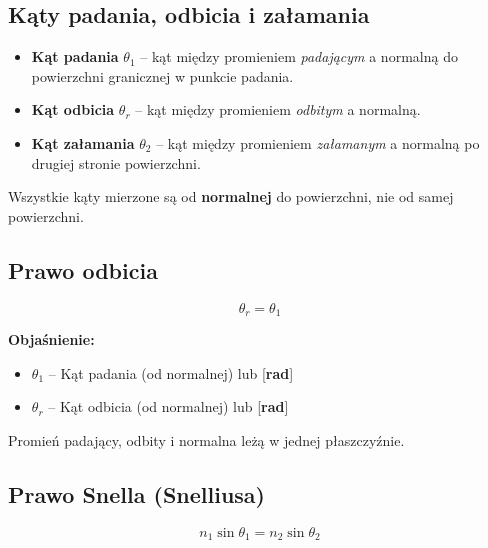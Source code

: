 \documentclass[12pt,a4paper]{article}
\newcommand{\oznaczenie}[2]{%
  \item $#1$ -- #2%
}
\begin{document}
\subsection{Kąty padania, odbicia i załamania}

\begin{itemize}
  \item \textbf{Kąt padania} $\theta_1$ -- kąt między promieniem \emph{padającym}
        a normalną do powierzchni granicznej w punkcie padania.
  \item \textbf{Kąt odbicia} $\theta_r$ -- kąt między promieniem \emph{odbitym}
        a normalną.
  \item \textbf{Kąt załamania} $\theta_2$ -- kąt między promieniem \emph{załamanym}
        a normalną po drugiej stronie powierzchni.
\end{itemize}

Wszystkie kąty mierzone są od \textbf{normalnej} do powierzchni, nie od samej powierzchni.

\subsection{Prawo odbicia}

\begin{wzorbox}
\begin{equation}
  \theta_r = \theta_1
  \label{eq:prawo_odbicia}
\end{equation}
\end{wzorbox}

\begin{objasnbox}
\textbf{Objaśnienie:}
\begin{itemize}[leftmargin=2em]
  \oznaczenie{\theta_1}{Kąt padania (od normalnej) \quad [°] lub [\textbf{rad}]}
  \oznaczenie{\theta_r}{Kąt odbicia (od normalnej) \quad [°] lub [\textbf{rad}]}
\end{itemize}
Promień padający, odbity i normalna leżą w jednej płaszczyźnie.
\end{objasnbox}

\subsection{Prawo Snella (Snelliusa)}

\begin{wzorbox}
\begin{equation}
  n_1 \sin\theta_1 = n_2 \sin\theta_2
  \label{eq:snell}
\end{equation}
\end{wzorbox}
\end{document}
